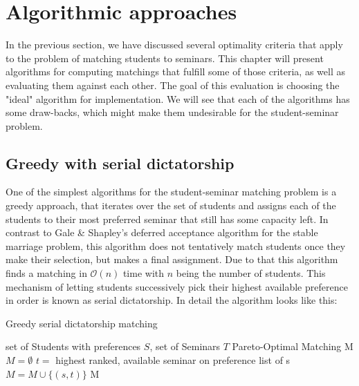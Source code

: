 \section{Algorithmic approaches}
In the previous section, we have discussed several optimality criteria that apply to the problem of matching students to seminars. This chapter will present algorithms for computing matchings that fulfill some of those criteria, as well as evaluating them against each other. The goal of this evaluation is choosing the "ideal" algorithm for implementation. We will see that each of the algorithms has some draw-backs, which might make them undesirable for the student-seminar problem. 

\subsection{Greedy with serial dictatorship}
One of the simplest algorithms for the student-seminar matching problem is a greedy approach, that iterates over the set of students and assigns each of the students to their most preferred seminar that still has some capacity left. In contrast to Gale \& Shapley's deferred acceptance algorithm for the stable marriage problem, this algorithm does not tentatively match students once they make their selection, but makes a final assignment. Due to that this algorithm finds a matching in $\mathcal{O}(n)$ time with $n$ being the number of students. This mechanism of letting students successively pick their highest available preference in order is known as serial dictatorship.\cite{MANEA2007316} In detail the algorithm looks like this: 

\begin{algorithm} %
    \caption{Greedy serial dictatorship matching} 
    \label{alg1} %
    \begin{algorithmic} %
        \Require set of Students with preferences $S$, set of Seminars $T$
        \Ensure Pareto-Optimal Matching M
        \State $M = \emptyset$
            \State $t =$ highest ranked, available seminar on preference list of s
                \State $M = M \cup \{(s, t)\}$
            \EndIf
        \EndFor
        \State\Return M
        \EndFunction
    \end{algorithmic}
\end{algorithm}

